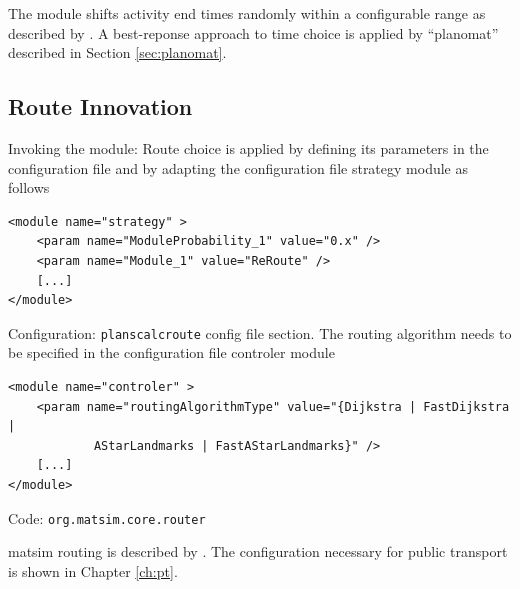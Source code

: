 The module shifts activity end times randomly within a configurable range as described by \citet[][]{BalmerEtAl_Timmermans_2005, Raney_PhDThesis_2005, Balmer_unpub_VSP_2004, BalmerEtAl_unpub_EIRASS_2004, BalmerEtAl_unpub_STRC_2004}. A best-reponse approach to time choice is applied by ``planomat'' described in Section \ref{sec:planomat}.

\subsection{Route Innovation}
\label{sec:routechoice}
\begin{compactitem}
\item Invoking the module: Route choice is applied by defining its parameters in the configuration file and by adapting the configuration file strategy module as follows
%
\begin{lstlisting}
<module name="strategy" >
    <param name="ModuleProbability_1" value="0.x" />
    <param name="Module_1" value="ReRoute" />
    [...]
</module>
\end{lstlisting}
%
\item Configuration: \lstinline|planscalcroute| config file section. The routing algorithm needs to be specified in the configuration file controler module
%
\begin{lstlisting}
<module name="controler" >
    <param name="routingAlgorithmType" value="{Dijkstra | FastDijkstra |
    		AStarLandmarks | FastAStarLandmarks}" />
    [...]
</module>
\end{lstlisting}
\item Code: \lstinline|org.matsim.core.router|
\end{compactitem}
%
\gls{matsim} routing is described by \citet[]{LefebvreBalmer_STRC_2007, LefebvreBalmer_TechRep_IVT_2007}. The configuration necessary for public transport is shown in Chapter \ref{ch:pt}.  


